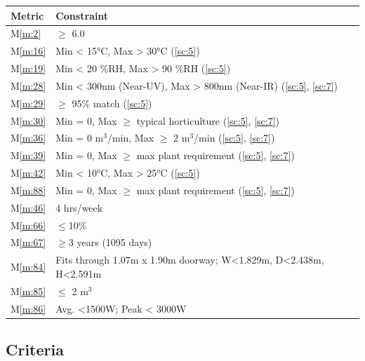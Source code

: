\documentclass{report}
\newcommand{\mref}[1]{M\ref{#1}}
\begin{document}
\begin{tabular}{|l|p{14.35cm}|}
    \hline
    \textbf{Metric} & \textbf{Constraint} \\
    \hline
    \mref{m:2} & $\ge$ 6.0 \hfill \cite{applicantguide}\\
    \hline
    \mref{m:16} & Min < 15°C, Max > 30°C \hfill (\ref{sc:5})\\
    \hline
    \mref{m:19} & Min < 20 \%RH, Max > 90 \%RH \hfill (\ref{sc:5}) \\
    \hline
    \mref{m:28} & Min < 300nm (Near-UV), Max > 800nm (Near-IR) \hfill (\ref{sc:5}, \ref{sc:7}) \\
    \hline
    \mref{m:29} & $\ge$ 95\% match \hfill (\ref{sc:5}) \\
    \hline
    \mref{m:30} & Min = 0, Max $\ge$ typical horticulture \hfill (\ref{sc:5}, \ref{sc:7}) \\
    \hline
    \mref{m:36} & Min = 0 m${}^3$/min, Max $\ge$ 2 m${}^3$/min \hfill (\ref{sc:5}, \ref{sc:7}) \\
    \hline
    \mref{m:39} & Min = 0, Max $\ge$ max plant requirement \hfill (\ref{sc:5}, \ref{sc:7}) \\
    \hline
    \mref{m:42} & Min < 10°C, Max > 25°C \hfill (\ref{sc:5})\\
    \hline
    \mref{m:88} & Min = 0, Max $\ge$ max plant requirement \hfill (\ref{sc:5}, \ref{sc:7}) \\
    \hline
    \mref{m:46} & 4 hrs/week \hfill \cite{applicantguide}\\
    \hline
    \mref{m:66} & $\le$10\% \hfill \cite{applicantguide}\\
    \hline
    \mref{m:67} & $\ge$3 years (1095 days) \hfill \cite{applicantguide}\\
    \hline
    \mref{m:84} & Fits through 1.07m x 1.90m doorway; W<1.829m, D<2.438m, H<2.591m \hfill \cite{applicantguide} \\
    \hline
    \mref{m:85} & $\le$ 2 m${}^3$ \hfill \cite{applicantguide}\\
    \hline
    \mref{m:86} & Avg. <1500W; Peak < 3000W \hfill \cite{applicantguide}\\
    \hline
\end{tabular}

\subsection{Criteria}
\label{sec:criteria}
\end{document}
